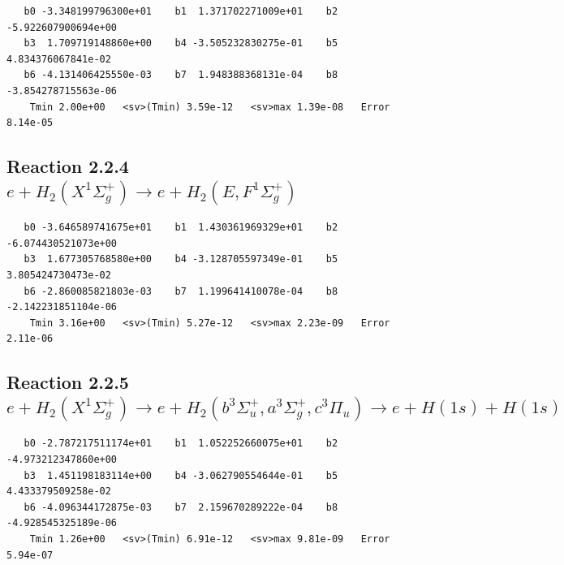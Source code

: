 \documentclass[12pt,dvipdfmx]{article}
\begin{document}
\begin{small}\begin{verbatim}
   b0 -3.348199796300e+01    b1  1.371702271009e+01    b2 -5.922607900694e+00
   b3  1.709719148860e+00    b4 -3.505232830275e-01    b5  4.834376067841e-02
   b6 -4.131406425550e-03    b7  1.948388368131e-04    b8 -3.854278715563e-06
    Tmin 2.00e+00   <sv>(Tmin) 3.59e-12   <sv>max 1.39e-08   Error 8.14e-05
\end{verbatim}\end{small}





\newpage
\subsection{
Reaction 2.2.4 $e + H_2(X^1\Sigma_g^+) \rightarrow e + H_2(E,F^1\Sigma_g^+)$}














\begin{small}\begin{verbatim}
   b0 -3.646589741675e+01    b1  1.430361969329e+01    b2 -6.074430521073e+00
   b3  1.677305768580e+00    b4 -3.128705597349e-01    b5  3.805424730473e-02
   b6 -2.860085821803e-03    b7  1.199641410078e-04    b8 -2.142231851104e-06
    Tmin 3.16e+00   <sv>(Tmin) 5.27e-12   <sv>max 2.23e-09   Error 2.11e-06
\end{verbatim}\end{small}

\newpage
\subsection{
Reaction 2.2.5 $e + H_2(X^1\Sigma_g^+) \rightarrow  e + H_2(b^3\Sigma_u^+, a^3\Sigma_g^+, c^3\Pi_u) \rightarrow
e + H(1s) + H(1s)$}






%
%





\begin{small}\begin{verbatim}
   b0 -2.787217511174e+01    b1  1.052252660075e+01    b2 -4.973212347860e+00
   b3  1.451198183114e+00    b4 -3.062790554644e-01    b5  4.433379509258e-02
   b6 -4.096344172875e-03    b7  2.159670289222e-04    b8 -4.928545325189e-06
    Tmin 1.26e+00   <sv>(Tmin) 6.91e-12   <sv>max 9.81e-09   Error 5.94e-07
\end{verbatim}\end{small}
\end{document}
